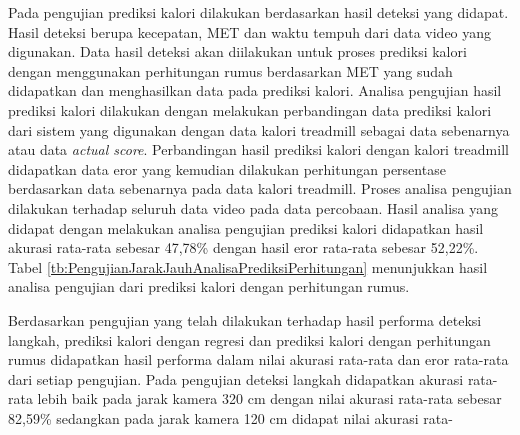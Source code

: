 Pada pengujian prediksi kalori dilakukan berdasarkan hasil deteksi yang didapat. Hasil deteksi berupa kecepatan, MET dan waktu tempuh dari data video yang digunakan. Data hasil deteksi akan diilakukan untuk proses prediksi kalori dengan menggunakan perhitungan rumus berdasarkan MET yang sudah didapatkan dan menghasilkan data pada prediksi kalori. Analisa pengujian hasil prediksi kalori dilakukan dengan melakukan perbandingan data prediksi kalori dari sistem yang digunakan dengan data kalori treadmill sebagai data sebenarnya atau data \emph{actual score}. Perbandingan hasil prediksi kalori dengan kalori treadmill didapatkan data eror yang kemudian dilakukan perhitungan persentase berdasarkan data sebenarnya pada data kalori treadmill. Proses analisa pengujian dilakukan terhadap seluruh data video pada data percobaan. Hasil analisa yang didapat dengan melakukan analisa pengujian prediksi kalori didapatkan hasil akurasi rata-rata sebesar 47,78\% dengan hasil eror rata-rata sebesar 52,22\%. Tabel \ref{tb:PengujianJarakJauhAnalisaPrediksiPerhitungan} menunjukkan hasil analisa pengujian dari prediksi kalori dengan perhitungan rumus.



Berdasarkan pengujian yang telah dilakukan terhadap hasil performa deteksi langkah, prediksi kalori dengan regresi dan prediksi kalori dengan perhitungan rumus didapatkan hasil performa dalam nilai akurasi rata-rata dan eror rata-rata dari setiap pengujian. Pada pengujian deteksi langkah didapatkan akurasi rata-rata lebih baik pada jarak kamera 320 cm dengan nilai akurasi rata-rata sebesar 82,59\% sedangkan pada jarak kamera 120 cm didapat nilai akurasi rata-

